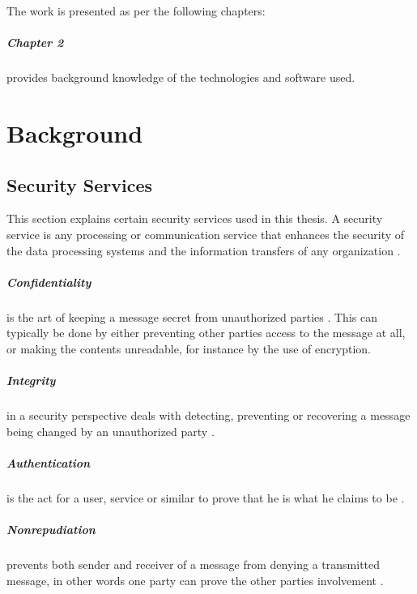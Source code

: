 \documentclass[pdftex,english,10pt,b5paper,twoside]{book}
\begin{document}
The work is presented as per the following chapters:

\paragraph{Chapter 2} provides background knowledge of the technologies and
software used.


\chapter{Background}

\section{Security Services}

This section explains certain security services used in this thesis. A security
service is any processing or communication service that enhances the security of
the data processing systems and the information transfers of any organization
\cite[p. 12]{stallings}.

\paragraph{Confidentiality} is the art of keeping a message secret from
unauthorized parties \cite[p. 18]{stallings}. This can typically be done by
either preventing other parties access to the message at all, or making the
contents unreadable, for instance by the use of encryption.

\paragraph{Integrity} in a security perspective deals with detecting,
preventing or recovering a message being changed by an unauthorized party
\cite{stallings}.

\paragraph{Authentication} is the act for a user, service or similar to prove
that he is what he claims to be \cite{stallings}.

\paragraph{Nonrepudiation} prevents both sender and receiver of a message
from denying a transmitted message, in other words one party can prove the
other parties involvement \cite{stallings}.
\end{document}
